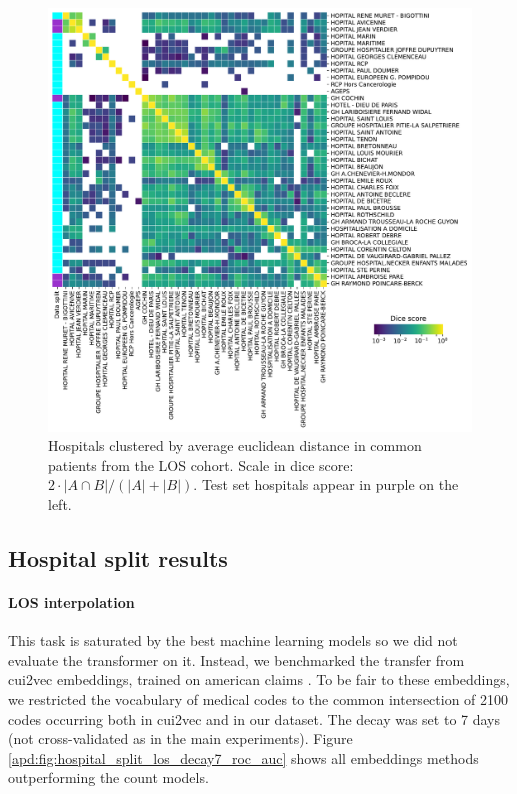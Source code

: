 \documentclass[french,12pt,twoside,a4paper]{book}
\begin{document}
\begin{appendices}
  \begin{figure}[!h]
    \centering
    \includegraphics[width=\textwidth]{img/chapter_3/hospital_split_coocurrence_dice_score.pdf}
    \caption{Hospitals clustered by average euclidean distance in common patients
      from the LOS cohort. Scale in dice score: $2 \cdot |A \cap B| / (|A| + |B|)$. Test
      set hospitals appear in purple on the left.}\label{apd:fig:hospital_split}
  \end{figure}


  \subsection{Hospital split results}

  \paragraph{LOS interpolation}\label{apd:hospital_split:los}

  This task is saturated by the best machine learning models so we did not
  evaluate the transformer on it. Instead, we benchmarked the transfer from
  cui2vec embeddings, trained on american claims \citep{beam2019clinical}. To be
  fair to these embeddings, we restricted the vocabulary of medical codes to the
  common intersection of 2100 codes occurring both in cui2vec and in our dataset.
  The decay was set to 7 days (not cross-validated as in the main experiments).
  Figure \ref{apd:fig:hospital_split_los_decay7_roc_auc} shows all
  embeddings methods outperforming the count models.



\end{appendices}
\end{document}

